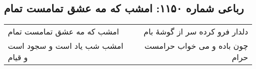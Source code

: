 \begin{center}
\section*{رباعی شماره ۱۱۵۰: امشب که مه عشق تمامست تمام}
\label{sec:1150}
\begin{longtable}{l p{0.5cm} r}
امشب که مه عشق تمامست تمام
&&
دلدار فرو کرده سر از گوشهٔ بام
\\
امشب شب یاد است و سجود است و قیام
&&
چون باده و می خواب حرامست حرام
\\
\end{longtable}
\end{center}

